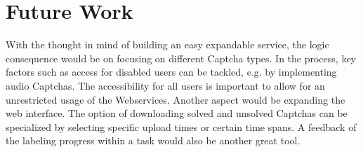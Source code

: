 \section{Future Work}
\label{sec:future_work}

With the thought in mind of building an easy expandable service, the logic consequence would be on focusing on different Captcha types. In the process, key factors such as access for disabled users can be tackled, e.g. by implementing audio Captchas. The accessibility for all users is important to allow for an unrestricted usage of the Webservices.
Another aspect would be expanding the web interface. The option of downloading solved and unsolved Captchas can be specialized by selecting specific upload times or certain time spans. A feedback of the labeling progress within a task would also be another great tool.


\clearpage